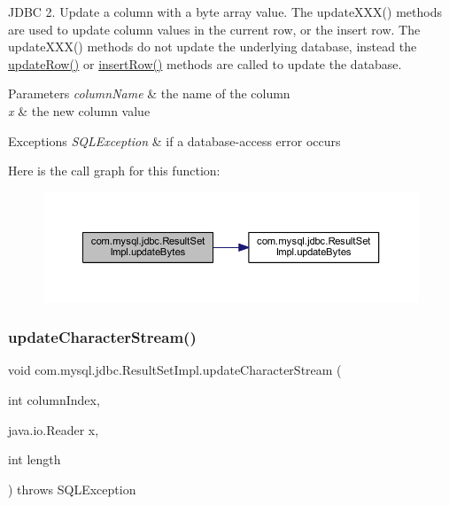 J\+D\+BC 2. Update a column with a byte array value. The update\+X\+X\+X() methods are used to update column values in the current row, or the insert row. The update\+X\+X\+X() methods do not update the underlying database, instead the \mbox{\hyperlink{classcom_1_1mysql_1_1jdbc_1_1_result_set_impl_a2842d32292d023aaeeafedeed3322981}{update\+Row()}} or \mbox{\hyperlink{classcom_1_1mysql_1_1jdbc_1_1_result_set_impl_a78e304e3279cbcf60392f18c1385e3bf}{insert\+Row()}} methods are called to update the database.


\begin{DoxyParams}{Parameters}
{\em column\+Name} & the name of the column \\
\hline
{\em x} & the new column value\\
\hline
\end{DoxyParams}

\begin{DoxyExceptions}{Exceptions}
{\em S\+Q\+L\+Exception} & if a database-\/access error occurs \\
\hline
\end{DoxyExceptions}
Here is the call graph for this function\+:
\nopagebreak
\begin{figure}[H]
\begin{center}
\leavevmode
\includegraphics[width=350pt]{classcom_1_1mysql_1_1jdbc_1_1_result_set_impl_a187964b00b0acfd59bb49bf015c3911e_cgraph}
\end{center}
\end{figure}
\mbox{\label{classcom_1_1mysql_1_1jdbc_1_1_result_set_impl_a06e47500f516d306c2329d032eb13353}} 
\subsubsection{\texorpdfstring{update\+Character\+Stream()}{updateCharacterStream()}\hspace{0.1cm}{\footnotesize\ttfamily [1/2]}}
{\footnotesize\ttfamily void com.\+mysql.\+jdbc.\+Result\+Set\+Impl.\+update\+Character\+Stream (\begin{DoxyParamCaption}\item[{int}]{column\+Index,  }\item[{java.\+io.\+Reader}]{x,  }\item[{int}]{length }\end{DoxyParamCaption}) throws S\+Q\+L\+Exception}

